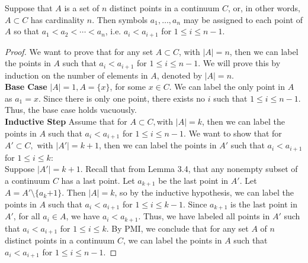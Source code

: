 \documentclass[11pt]{article}
\begin{document}
\begin{theorem}[3.5] Suppose that $A$ is a set of $n$ distinct points in a continuum $C$, or, in other words, $A \subset C$ has cardinality $n$.  Then symbols $a_1, \dotsc, a_n$ may be assigned to each point of $A$ so that $a_1 < a_2 < \dotsm < a_n$, i.e. $a_i < a_{i + 1}$ for $1 \leq i \leq n - 1$.
\end{theorem}
\begin{proof}
We want to prove that for any set $A \subset C$, with $|A| = n$, then we can label the points in $A$ such that $a_i < a_{i+1}$ for $1 \leq i \leq n-1$. 
We will prove this by induction on the number of elements in $A$, denoted by $|A| = n$. \\
\textbf{Base Case} $|A| = 1, A = \{x\}$, for some $x \in C$. We can label the only point in $A$ as $a_1 = x$. Since there is only one point, there exists no $i$ such that $1 \leq i \leq n-1$. Thus, the base case holds vacuously. \\
\textbf{Inductive Step} Assume that for $A\subset C, $with $|A| = k$, then we can label the points in $A$ such that $a_i < a_{i+1}$ for $1 \leq i \leq n-1$. We want to show that for $A' \subset C,$ with $|A'| = k+1$, then we can label the points in $A'$ such that $a_i < a_{i+1}$ for $1 \leq i \leq k$: \\
Suppose $|A'| = k+1$. Recall that from Lemma 3.4, that any nonempty subset of a continuum $C$ has a last point. Let $a_{k+1}$ be the last point in $A'$. Let $A = A' \setminus \{a_k{+1}\}$. Then $|A| = k$, so by the inductive hypothesis, we can label the points in $A$ such that $a_i < a_{i+1}$ for $1 \leq i \leq k-1$. Since $a_{k+1}$ is the last point in $A'$, for all $a_i \in A$, we have $a_i < a_{k+1}$. Thus, we have labeled all points in $A'$ such that $a_i < a_{i+1}$ for $1 \leq i \leq k$. By PMI, we conclude that for any set $A$ of $n$ distinct points in a continuum $C$, we can label the points in $A$ such that $a_i < a_{i+1}$ for $1 \leq i \leq n-1$.
\end{proof}
\end{document}
